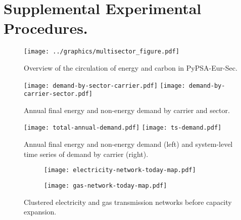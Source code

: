 
\section*{Supplemental Experimental Procedures.}
\label{sec:si}
\normalsize

\begin{figure}[ht!]
    \centering
    \texttt{[image: ../graphics/multisector\_figure.pdf]}
    \caption{Overview of the circulation of energy and carbon in PyPSA-Eur-Sec.}
    \label{fig:multisector}
\end{figure}

\begin{figure}[ht!]
    \centering
    \texttt{[image: demand-by-sector-carrier.pdf]}
    \texttt{[image: demand-by-carrier-sector.pdf]}
    \caption{Annual final energy and non-energy demand by carrier and sector.}
    \label{fig:demand-by-sector-carrier}
\end{figure}

\begin{figure}[ht!]
    \centering
    \texttt{[image: total-annual-demand.pdf]}
    \texttt{[image: ts-demand.pdf]}
    \caption{Annual final energy and non-energy demand (left) and system-level time series of demand by carrier (right).}
    \label{fig:demand-time}
\end{figure}

\begin{figure}[ht!]
    \centering
\begin{subfigure}[t]{0.49\textwidth}
    \centering
    \texttt{[image: electricity-network-today-map.pdf]}
\end{subfigure}
\begin{subfigure}[t]{0.49\textwidth}
    \centering
    \texttt{[image: gas-network-today-map.pdf]}
\end{subfigure}
\caption{Clustered electricity and gas transmission networks before capacity expansion.}
\label{fig:clustered-networks}
\end{figure}



